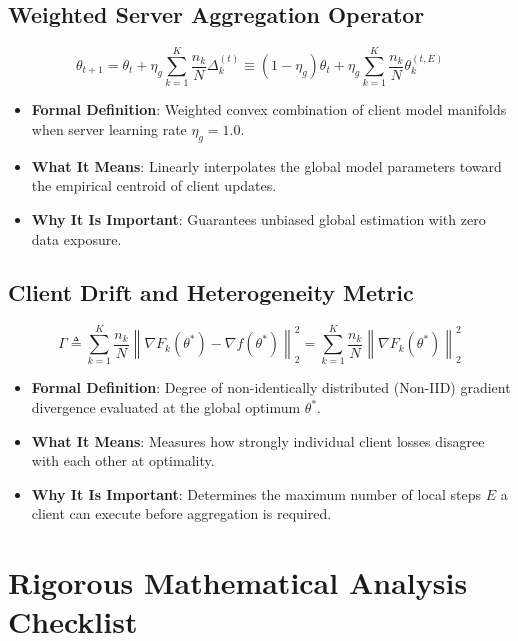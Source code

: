 \documentclass[11pt,a4paper]{article}
\theoremstyle{definition}
\begin{document}
\subsection{Weighted Server Aggregation Operator}
{\boldmath
\begin{equation}
\theta_{t+1} = \theta_t + \eta_g \sum_{k=1}^K \frac{n_k}{N} \Delta_k^{(t)} \equiv \left(1 - \eta_g\right) \theta_t + \eta_g \sum_{k=1}^K \frac{n_k}{N} \theta_k^{(t, E)}
\end{equation}
}
\begin{itemize}
    \item \textbf{Formal Definition}: Weighted convex combination of client model manifolds when server learning rate $\eta_g = 1.0$.
    \item \textbf{What It Means}: Linearly interpolates the global model parameters toward the empirical centroid of client updates.
    \item \textbf{Why It Is Important}: Guarantees unbiased global estimation with zero data exposure.
\end{itemize}

\subsection{Client Drift and Heterogeneity Metric}
{\boldmath
\begin{equation}
\Gamma \triangleq \sum_{k=1}^K \frac{n_k}{N} \left\| \nabla F_k(\theta^*) - \nabla f(\theta^*) \right\|_2^2 = \sum_{k=1}^K \frac{n_k}{N} \left\| \nabla F_k(\theta^*) \right\|_2^2
\end{equation}
}
\begin{itemize}
    \item \textbf{Formal Definition}: Degree of non-identically distributed (Non-IID) gradient divergence evaluated at the global optimum $\theta^*$.
    \item \textbf{What It Means}: Measures how strongly individual client losses disagree with each other at optimality.
    \item \textbf{Why It Is Important}: Determines the maximum number of local steps $E$ a client can execute before aggregation is required.
\end{itemize}

\section{Rigorous Mathematical Analysis Checklist}
\end{document}
